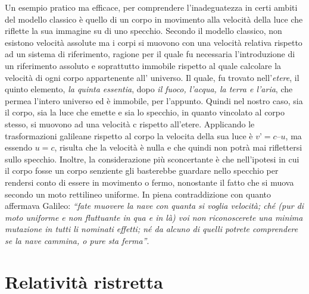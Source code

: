 \documentclass[a4paper,12pt]{report}
\begin{document}
Un esempio pratico ma efficace, per comprendere l’inadeguatezza in certi ambiti del modello classico è quello di un corpo in movimento alla velocità della luce che riflette la sua immagine su di uno specchio. Secondo il modello classico, non esistono velocità assolute ma i corpi si muovono con una velocità relativa rispetto ad un sistema di riferimento, ragione per il quale fu necessaria l’introduzione di un riferimento assoluto e soprattutto immobile rispetto al quale calcolare la velocità di ogni corpo appartenente all’ universo. Il quale, fu trovato  nell’\textit{etere}, il quinto elemento, \textit{la quinta essentia}, dopo \textit{il fuoco, l’acqua, la terra e l’aria}, che permea l’intero universo ed è immobile\cite{aristotele}, per l’appunto.  Quindi nel nostro caso, sia il corpo, sia la luce che emette e sia lo specchio, in quanto vincolato al corpo stesso, si muovono ad una velocità c rispetto all’etere. Applicando le trasformazioni galileane rispetto al corpo la velocita della sua luce è $v’= c – u$, ma essendo $u = c$, risulta che la velocità è nulla e che quindi non potrà mai riflettersi sullo specchio.
Inoltre, la considerazione più sconcertante è che nell’ipotesi in cui il corpo fosse un corpo senziente  gli basterebbe guardare nello specchio per rendersi conto di essere in movimento o fermo, nonostante il fatto che si muova secondo un moto rettilineo uniforme. In piena contraddizione con quanto affermava Galileo: \textit{“fate muovere la nave con quanta si voglia velocità; ché
(pur di moto uniforme e non fluttuante in qua e in là) voi non
riconoscerete una minima mutazione in tutti li nominati effetti; né da
alcuno di quelli potrete comprendere se la nave cammina, o pure sta
ferma”}\cite{massimisistemi}.

\section{Relatività ristretta}
\end{document}
